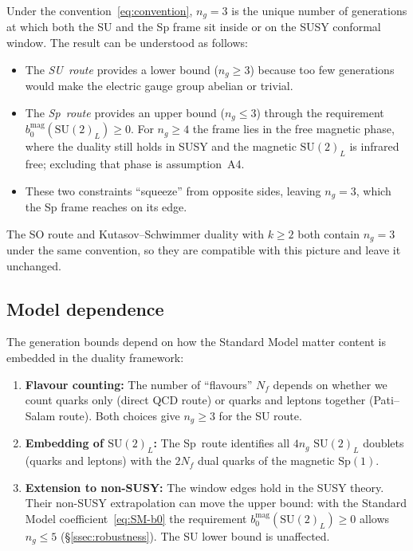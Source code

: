 \documentclass[11pt,a4paper]{article}
\theoremstyle{plain}
\theoremstyle{definition}
\theoremstyle{remark}
\newcommand{\Nf}{N_{\!f}}
\newcommand{\ngen}{n_g}
\newcommand{\SU}[1]{\mathrm{SU}(#1)}
\newcommand{\Sp}[1]{\mathrm{Sp}(#1)}
\begin{document}
Under the convention~\eqref{eq:convention}, $\ngen = 3$ is the unique
number of generations at which both the SU and the Sp frame sit inside
or on the SUSY conformal window.  The result can be understood as
follows:
\begin{itemize}
  \item The \emph{SU~route} provides a lower bound ($\ngen \geq 3$) because
    too few generations would make the electric gauge group abelian or
    trivial.
  \item The \emph{Sp~route} provides an upper bound ($\ngen \leq 3$)
    through the requirement $b_0^{\mathrm{mag}}(\SU{2}_L) \geq 0$.  For
    $\ngen \geq 4$ the frame lies in the free magnetic phase, where the
    duality still holds in SUSY and the magnetic $\SU{2}_L$ is infrared
    free; excluding that phase is assumption~A4.
  \item These two constraints ``squeeze'' from opposite sides, leaving
    $\ngen = 3$, which the Sp frame reaches on its edge.
\end{itemize}

The SO route and Kutasov--Schwimmer duality with $k \geq 2$ both contain
$\ngen = 3$ under the same convention, so they are compatible with this
picture and leave it unchanged.

\subsection{Model dependence}

The generation bounds depend on how the Standard Model matter content
is embedded in the duality framework:
\begin{enumerate}
  \item \textbf{Flavour counting:} The number of ``flavours'' $\Nf$
    depends on whether we count quarks only (direct QCD route) or
    quarks and leptons together (Pati--Salam route).  Both choices give
    $\ngen \geq 3$ for the SU route.
  \item \textbf{Embedding of $\SU{2}_L$:} The Sp~route identifies all
    $4\ngen$ $\SU{2}_L$ doublets (quarks and leptons) with the $2\Nf$
    dual quarks of the magnetic $\Sp{1}$.
  \item \textbf{Extension to non-SUSY:} The window edges hold in the
    SUSY theory.  Their non-SUSY extrapolation can move the upper bound:
    with the Standard Model coefficient~\eqref{eq:SM-b0} the requirement
    $b_0^{\mathrm{mag}}(\SU{2}_L) \geq 0$ allows $\ngen \leq 5$
    (\S\ref{ssec:robustness}).  The SU lower bound is unaffected.
\end{enumerate}
\end{document}
